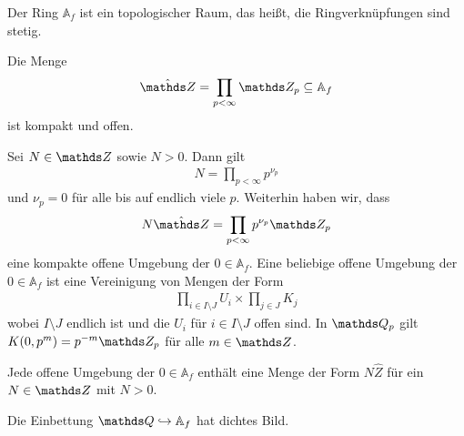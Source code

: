 \begin{prop}
Der Ring $\mathbb{A}_f$ ist ein topologischer Raum, das heißt, die Ringverknüpfungen sind stetig.
\end{prop}

\begin{prop}
Die Menge
\begin{align*}
\hat{\Z}=\prod_{p <\infty} \Z_p \subseteq \mathbb{A}_f
\end{align*}
ist kompakt und offen.
\end{prop}

Sei $N\in \Z$ sowie $N>0$. Dann gilt
\begin{align*}
N=\prod_{p<\infty} p^{\nu_p}
\end{align*}
und $\nu_p=0$ für alle bis auf endlich viele $p$.
Weiterhin haben wir, dass
\begin{align*}
N \hat{\Z}=\prod_{p <\infty} p^{\nu_p}\Z_p
\end{align*}
eine kompakte offene Umgebung der $0 \in \mathbb{A}_f$.
Eine beliebige offene Umgebung der $0 \in \mathbb{A}_f$ ist eine Vereinigung von Mengen der Form
\begin{align*}
\prod_{i \in I\setminus J} U_i \times \prod_{j \in J} K_j
\end{align*}
wobei $I\setminus J$ endlich ist und die $U_i$ für $i \in I \setminus J$ offen sind.
In $\Q_p$ gilt $K(0,p^m)=p^{-m}\Z_p$ für alle $m \in \Z$.

\begin{prop}
Jede offene Umgebung der $0\in \mathbb{A}_f$ enthält eine Menge der Form $N \hat{Z}$ für ein $N \in \Z$ mit $N>0$.
\end{prop}

\begin{prop}
Die Einbettung $\Q \hookrightarrow \mathbb{A}_f$ hat dichtes Bild.
\end{prop}